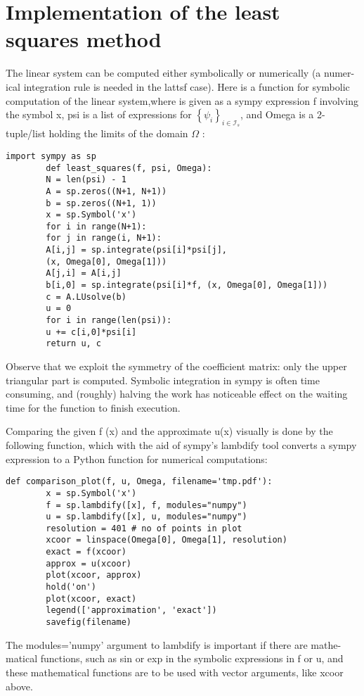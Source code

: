 \documentclass[../main.tex]{subfiles}
\begin{document}
	\section[Implementation of the least squares method]{Implementation of the least squares method}
	\label{sec:sec_2_4}
	\noindent The linear system can be computed either symbolically or numerically (a numer-
	ical integration rule is needed in the lattsf case). Here is a function for symbolic
	computation of the linear system,where  is given as a sympy expression f
	involving the symbol x, psi is a list of expressions for $\left\{\psi_{i}\right\}_{i \in \mathcal{I}_{s}}$, and Omega is a 2-tuple/list holding the limits of the domain $\Omega$ :
	
	\begin{lstlisting}[numbers=none]
		import sympy as sp
		def least_squares(f, psi, Omega):
		N = len(psi) - 1
		A = sp.zeros((N+1, N+1))
		b = sp.zeros((N+1, 1))
		x = sp.Symbol('x')
		for i in range(N+1):
		for j in range(i, N+1):
		A[i,j] = sp.integrate(psi[i]*psi[j],
		(x, Omega[0], Omega[1]))
		A[j,i] = A[i,j]
		b[i,0] = sp.integrate(psi[i]*f, (x, Omega[0], Omega[1]))
		c = A.LUsolve(b)
		u = 0
		for i in range(len(psi)):
		u += c[i,0]*psi[i]
		return u, c
	\end{lstlisting}
	Observe that we exploit the symmetry of the coefficient matrix: only the
	upper triangular part is computed. Symbolic integration in sympy is often
	time consuming, and (roughly) halving the work has noticeable effect on the
	waiting time for the function to finish execution.
	
	Comparing the given f (x) and the approximate u(x) visually is done by
	the following function, which with the aid of sympy's lambdify tool converts a
	sympy expression to a Python function for numerical computations:
	\begin{lstlisting}[numbers=none]
		def comparison_plot(f, u, Omega, filename='tmp.pdf'):
		x = sp.Symbol('x')
		f = sp.lambdify([x], f, modules="numpy")
		u = sp.lambdify([x], u, modules="numpy")
		resolution = 401 # no of points in plot
		xcoor = linspace(Omega[0], Omega[1], resolution)
		exact = f(xcoor)
		approx = u(xcoor)
		plot(xcoor, approx)
		hold('on')
		plot(xcoor, exact)
		legend(['approximation', 'exact'])
		savefig(filename)
	\end{lstlisting}
	The modules='numpy' argument to lambdify is important if there are mathe-
	matical functions, such as sin or exp in the symbolic expressions in f or u, and
	these mathematical functions are to be used with vector arguments, like xcoor
	above.
	
\end{document}
